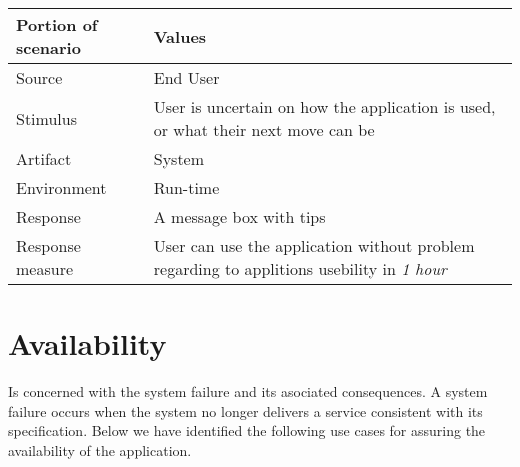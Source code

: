 \begin{itemize}
        \begin{tabular}{| l | p{7cm} |}
            \hline
            \rowcolor[gray]{0.8}
            \textbf{Portion of scenario} & \textbf{Values} \\
            \hline
            Source & End User \\
            Stimulus & User is uncertain on how the application is used, or what their next move can be \\
            Artifact & System \\
            Environment & Run-time \\
            Response & A message box with tips \\
            Response measure  & User can use the application without problem regarding to applitions usebility in \emph{1 hour}\\
            \hline
        \end{tabular}
\end{itemize}

\section{Availability}
Is concerned with the system failure and its asociated consequences. A system failure occurs when the system no longer delivers a service consistent with its specification\cite{ProgarkPensum}. Below we have identified the following use cases for assuring the availability of the application.

